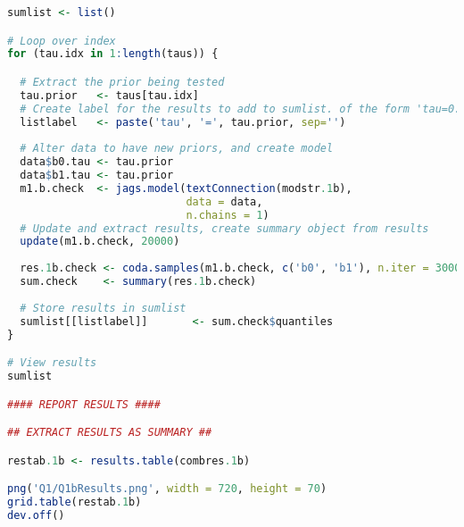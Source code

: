 \documentclass[11pt]{article}
\begin{document}
\begin{lstlisting}[language=R]
sumlist <- list()

# Loop over index
for (tau.idx in 1:length(taus)) {

  # Extract the prior being tested
  tau.prior   <- taus[tau.idx]
  # Create label for the results to add to sumlist. of the form 'tau=0.01'
  listlabel   <- paste('tau', '=', tau.prior, sep='')
  
  # Alter data to have new priors, and create model
  data$b0.tau <- tau.prior
  data$b1.tau <- tau.prior
  m1.b.check  <- jags.model(textConnection(modstr.1b), 
                            data = data, 
                            n.chains = 1)
  # Update and extract results, create summary object from results
  update(m1.b.check, 20000)
  
  res.1b.check <- coda.samples(m1.b.check, c('b0', 'b1'), n.iter = 30000, thin = 4)
  sum.check    <- summary(res.1b.check)
  
  # Store results in sumlist
  sumlist[[listlabel]]       <- sum.check$quantiles
}

# View results
sumlist

#### REPORT RESULTS ####

## EXTRACT RESULTS AS SUMMARY ##

restab.1b <- results.table(combres.1b)

png('Q1/Q1bResults.png', width = 720, height = 70)
grid.table(restab.1b)
dev.off()
\end{lstlisting}

\newpage
\end{document}
